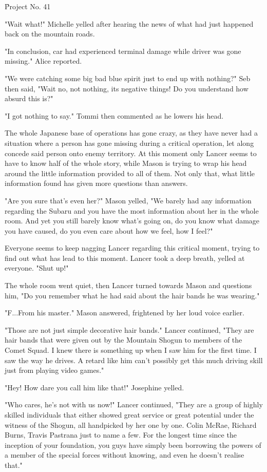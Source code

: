 \h{Project No. 41}

"Wait what!" Michelle yelled after hearing the news of what had just happened back on the mountain roads. 

"In conclusion, car had experienced terminal damage while driver was gone missing." Alice reported. 

"We were catching some big bad blue spirit just to end up with nothing?" Seb then said, "Wait no, not nothing, its negative things! Do you understand how absurd this is?"

"I got nothing to say." Tommi then commented as he lowers his head. 

The whole Japanese base of operations has gone crazy, as they have never had a situation where a person has gone missing during a critical operation, let along concede said person onto enemy territory.
At this moment only Lancer seems to have to know half of the whole story, while Mason is trying to wrap his head around the little information provided to all of them. Not only that, what little information found has given more questions than answers. 

"Are you sure that's even her?" Mason yelled, "We barely had any information regarding the Subaru and you have the most information about her in the whole room. And yet you still barely know what's going on, do you know what damage you have caused, do you even care about how we feel, how I feel?"

Everyone seems to keep nagging Lancer regarding this critical moment, trying to find out what has lead to this moment. 
Lancer took a deep breath, yelled at everyone. "Shut up!"

The whole room went quiet, then Lancer turned towards Mason and questions him, "Do you remember what he had said about the hair bands he was wearing."

"F...From his master." Mason answered, frightened by her loud voice earlier. 

"Those are not just simple decorative hair bands." Lancer continued, "They are hair bands that were given out by the Mountain Shogun to members of the Comet Squad.
I knew there is something up when I saw him for the first time. 
I saw the way he drives. 
A retard like him can't possibly get this much driving skill just from playing video games."

"Hey! How dare you call him like that!" Josephine yelled. 

"Who cares, he's not with us now!" Lancer continued, "They are a group of highly skilled individuals that either showed great service or great potential under the witness of the Shogun, all handpicked by her one by one. Colin McRae, Richard Burns, Travis Pastrana just to name a few. For the longest time since the inception of your foundation, you guys have simply been borrowing the powers of a member of the special forces without knowing, and even he doesn't realise that."

